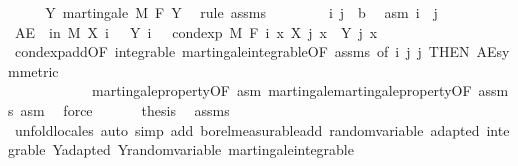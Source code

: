 \begin{isabellebody}
%
\isadelimproof
%
\endisadelimproof
%
\isatagproof
{}\isamarkupfalse%
\ {\isacharminus}{\kern0pt}\isanewline
\ \ \isamarkupfalse%
\ Y{\isacharcolon}{\kern0pt}\ martingale\ M\ F\ Y\ \isamarkupfalse%
\ {\isacharparenleft}{\kern0pt}rule\ assms{\isacharparenright}{\kern0pt}\isanewline
\ \ \isacommand{{\isacharbraceleft}{\kern0pt}}\isamarkupfalse%
\isanewline
\ \ \ \ \isamarkupfalse%
\ i\ j\ {\isacharcolon}{\kern0pt}{\isacharcolon}{\kern0pt}\ {\isacharprime}{\kern0pt}b\ \isamarkupfalse%
\ asm{\isacharcolon}{\kern0pt}\ {\isachardoublequoteopen}i\ {\isasymle}\ j{\isachardoublequoteclose}\isanewline
\ \ \ \ \isamarkupfalse%
\ {\isachardoublequoteopen}AE\ {\isasymxi}\ in\ M{\isachardot}{\kern0pt}\ X\ i\ {\isasymxi}\ {\isacharplus}{\kern0pt}\ Y\ i\ {\isasymxi}\ {\isacharequal}{\kern0pt}\ cond{\isacharunderscore}{\kern0pt}exp\ M\ {\isacharparenleft}{\kern0pt}F\ i{\isacharparenright}{\kern0pt}\ {\isacharparenleft}{\kern0pt}{\isasymlambda}x{\isachardot}{\kern0pt}\ X\ j\ x\ {\isacharplus}{\kern0pt}\ Y\ j\ x{\isacharparenright}{\kern0pt}\ {\isasymxi}{\isachardoublequoteclose}\ \isanewline
\ \ \ \ \ \ \isamarkupfalse%
\ cond{\isacharunderscore}{\kern0pt}exp{\isacharunderscore}{\kern0pt}add{\isacharbrackleft}{\kern0pt}OF\ integrable\ martingale{\isachardot}{\kern0pt}integrable{\isacharbrackleft}{\kern0pt}OF\ assms{\isacharbrackright}{\kern0pt}{\isacharcomma}{\kern0pt}\ of\ i\ j\ j{\isacharcomma}{\kern0pt}\ THEN\ AE{\isacharunderscore}{\kern0pt}symmetric{\isacharbrackright}{\kern0pt}\ \isanewline
\ \ \ \ \ \ \ \ \ \ \ \ martingale{\isacharunderscore}{\kern0pt}property{\isacharbrackleft}{\kern0pt}OF\ asm{\isacharbrackright}{\kern0pt}\ martingale{\isachardot}{\kern0pt}martingale{\isacharunderscore}{\kern0pt}property{\isacharbrackleft}{\kern0pt}OF\ assms\ asm{\isacharbrackright}{\kern0pt}\ \isamarkupfalse%
\ force\isanewline
\ \ \isacommand{{\isacharbraceright}{\kern0pt}}\isamarkupfalse%
\isanewline
\ \ \isamarkupfalse%
\ {\isacharquery}{\kern0pt}thesis\ \isamarkupfalse%
\ assms\isanewline
\ \ \isamarkupfalse%
\ {\isacharparenleft}{\kern0pt}unfold{\isacharunderscore}{\kern0pt}locales{\isacharparenright}{\kern0pt}\ {\isacharparenleft}{\kern0pt}auto\ simp\ add{\isacharcolon}{\kern0pt}\ borel{\isacharunderscore}{\kern0pt}measurable{\isacharunderscore}{\kern0pt}add\ random{\isacharunderscore}{\kern0pt}variable\ adapted\ integrable\ Y{\isachardot}{\kern0pt}adapted\ Y{\isachardot}{\kern0pt}random{\isacharunderscore}{\kern0pt}variable\ martingale{\isachardot}{\kern0pt}integrable{\isacharparenright}{\kern0pt}\isanewline

\end{isabellebody}
